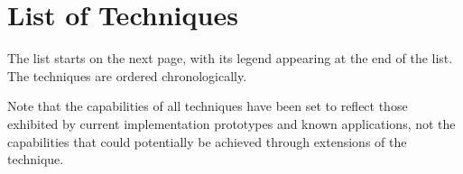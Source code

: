 %

\pagestyle{headings-chap-only}

\chapter{List of Techniques}

The list starts on the next page, with its legend appearing at the end of the
list.
%
The techniques are ordered chronologically.

Note that the capabilities of all techniques have been set to reflect those
exhibited by current implementation prototypes and known applications, not the
capabilities that could potentially be achieved through extensions of the
technique.

\begingroup
\small

\def\abbvPrinciple{PR}
\def\abbvScope{SC}
\def\abbvOptimal{OP}
\def\abbvMultiOutOp{MO}
\def\abbvDisjointOutOp{DO}
\def\abbvIntBlockOp{IB}
\def\abbvIntDepOp{IN}

\def\pME{ME}
\def\pMEPlusAppend{$^{+}$}
\def\pMEPlusInText{\pME\pMEPlusAppend}
\def\pMEPlus{%
  \pME\rlap{\pMEPlusAppend}%
}
\def\pTC{TC}
\def\pDC{DC}
\def\pTD{TD}
\def\pGC{GC}
\def\pMS{MS}
\def\notSupported{%
  \tikz{%
    \node [not supported] {};
  }%
}
\def\partSupported{%
  \tikz{%
    \node [not supported] (c) {};
    \draw [draw=none, fill=black]
          (c.south) arc (270:90:\pgfkeysvalueof{/tikz/circle radius})
          --
          cycle;
  }%
}
\def\fullySupported{%
  \tikz{%
    \node [fully supported] {};
  }%
}
\newcommand{\shrinkSupportCircle}[1]{%
  \maxsizebox{6pt}{6pt}{#1}%
}
\def\notSupportedSmall{%
  \shrinkSupportCircle{\notSupported}%
}
\def\partSupportedSmall{%
  \shrinkSupportCircle{\partSupported}%
}
\def\fullySupportedSmall{%
  \shrinkSupportCircle{\fullySupported}%
}
\def\localScope{L}
\def\globalScope{G}

\let\oldtabhead\tabhead
\renewcommand{\tabhead}[1]{%
  {\oldtabhead\relsize{.5}\textsc{\MakeLowercase{#1}}}%
}

